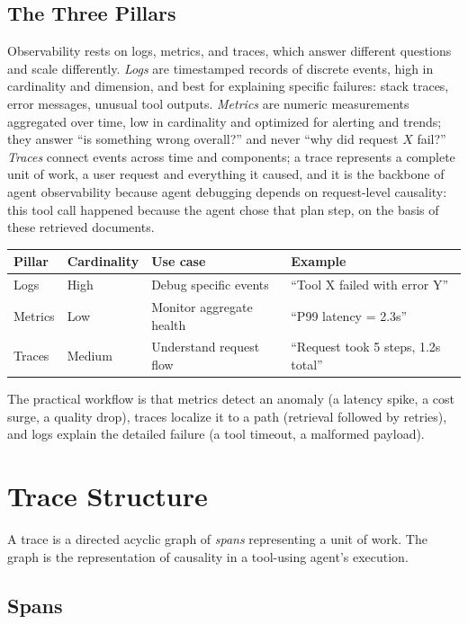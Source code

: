 \documentclass[11pt]{book}
\begin{document}
\subsection{The Three Pillars}

Observability rests on logs, metrics, and traces, which answer different questions and scale differently. \textit{Logs} are timestamped records of discrete events, high in cardinality and dimension, and best for explaining specific failures: stack traces, error messages, unusual tool outputs. \textit{Metrics} are numeric measurements aggregated over time, low in cardinality and optimized for alerting and trends; they answer ``is something wrong overall?'' and never ``why did request $X$ fail?'' \textit{Traces} connect events across time and components; a trace represents a complete unit of work, a user request and everything it caused, and it is the backbone of agent observability because agent debugging depends on request-level causality: this tool call happened because the agent chose that plan step, on the basis of these retrieved documents.

\begin{center}
\begin{tabular}{llll}
\toprule
Pillar & Cardinality & Use case & Example \\
\midrule
Logs & High & Debug specific events & ``Tool X failed with error Y'' \\
Metrics & Low & Monitor aggregate health & ``P99 latency = 2.3s'' \\
Traces & Medium & Understand request flow & ``Request took 5 steps, 1.2s total'' \\
\bottomrule
\end{tabular}
\end{center}

The practical workflow is that metrics detect an anomaly (a latency spike, a cost surge, a quality drop), traces localize it to a path (retrieval followed by retries), and logs explain the detailed failure (a tool timeout, a malformed payload).

\section{Trace Structure}

A trace is a directed acyclic graph of \emph{spans} representing a unit of work. The graph is the representation of causality in a tool-using agent's execution.

\subsection{Spans}
\end{document}
